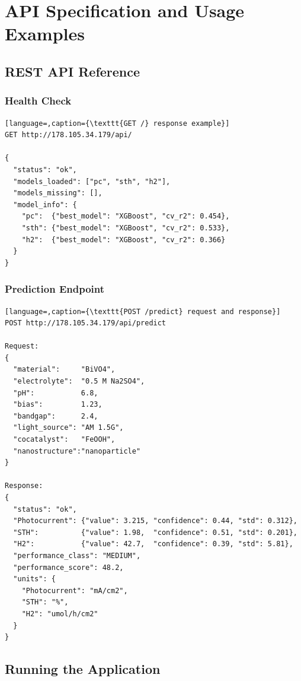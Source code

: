 \chapter{API Specification and Usage Examples}\label{app:B}

\section{REST API Reference}

\subsection{Health Check}

\begin{lstlisting}[language=,caption={\texttt{GET /} response example}]
GET http://178.105.34.179/api/

{
  "status": "ok",
  "models_loaded": ["pc", "sth", "h2"],
  "models_missing": [],
  "model_info": {
    "pc":  {"best_model": "XGBoost", "cv_r2": 0.454},
    "sth": {"best_model": "XGBoost", "cv_r2": 0.533},
    "h2":  {"best_model": "XGBoost", "cv_r2": 0.366}
  }
}
\end{lstlisting}

\subsection{Prediction Endpoint}

\begin{lstlisting}[language=,caption={\texttt{POST /predict} request and response}]
POST http://178.105.34.179/api/predict

Request:
{
  "material":     "BiVO4",
  "electrolyte":  "0.5 M Na2SO4",
  "pH":           6.8,
  "bias":         1.23,
  "bandgap":      2.4,
  "light_source": "AM 1.5G",
  "cocatalyst":   "FeOOH",
  "nanostructure":"nanoparticle"
}

Response:
{
  "status": "ok",
  "Photocurrent": {"value": 3.215, "confidence": 0.44, "std": 0.312},
  "STH":          {"value": 1.98,  "confidence": 0.51, "std": 0.201},
  "H2":           {"value": 42.7,  "confidence": 0.39, "std": 5.81},
  "performance_class": "MEDIUM",
  "performance_score": 48.2,
  "units": {
    "Photocurrent": "mA/cm2",
    "STH": "%",
    "H2": "umol/h/cm2"
  }
}
\end{lstlisting}

\section{Running the Application}

